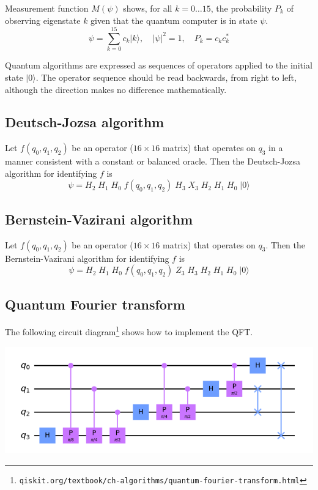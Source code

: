 \documentclass[12pt]{article}
\begin{document}
\bigskip
\noindent
Measurement function $M(\psi)$ shows, for all $k=0\ldots15$, the probability $P_k$ of observing eigenstate $k$
given that the quantum computer is in state $\psi$.
\begin{equation*}
\psi=\sum_{k=0}^{15}c_k|k\rangle,\quad|\psi|^2=1,\quad P_k=c_kc_k^*
\end{equation*}

\noindent
Quantum algorithms are expressed as sequences of operators applied
to the initial state $|0\rangle$.
The operator sequence should be read backwards, from right to left,
although the direction makes no difference mathematically.

\subsection*{Deutsch-Jozsa algorithm}
Let $f(q_0,q_1,q_2)$ be an operator ($16\times16$ matrix) that operates on $q_3$
in a manner consistent with a constant or balanced oracle.
Then the Deutsch-Jozsa algorithm for identifying $f$ is
\begin{equation*}
\psi = H_2 \; H_1 \; H_0 \; f(q_0,q_1,q_2) \; H_3 \; X_3 \; H_2 \; H_1 \; H_0 \; |0\rangle
\end{equation*}

\subsection*{Bernstein-Vazirani algorithm}
Let $f(q_0,q_1,q_2)$ be an operator ($16\times16$ matrix) that operates on $q_3$.
Then the Bernstein-Vazirani algorithm for identifying $f$ is
\begin{equation*}
\psi = H_2 \; H_1 \; H_0 \; f(q_0,q_1,q_2) \; Z_3 \; H_3 \; H_2 \; H_1 \; H_0 \; |0\rangle
\end{equation*}

\subsection*{Quantum Fourier transform}
The following circuit diagram\footnote{\tt qiskit.org/textbook/ch-algorithms/quantum-fourier-transform.html}
shows how to implement the QFT.

\begin{center}
\includegraphics[scale=0.5]{qft.png}
\end{center}
\end{document}
